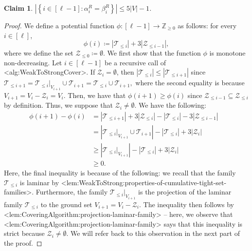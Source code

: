 \documentclass{article}
\def\Cref#1{<#1>}%
\newtheorem{claim}{Claim}[section]
\newcommand{\zeros}{\ensuremath{\mathcal{Z}}\xspace}
\newcommand{\maximalTightSetFamily}[1]{\ensuremath{\calT_{#1}}\xspace}
\newcommand{\cumulativeMaximalTightSetFamily}[1]{\ensuremath{\calT_{\leq #1}}}
\newcommand{\projCumulativeMaximalTightSetFamily}[2]{\ensuremath{\calT_{\leq #1}|_{V_{#2}}}}
\newcommand{\cumulativeZeros}[1]{\ensuremath{\calZ_{\leq #1}}\xspace}
\providecommand{\Z}{\mathbb{Z}}
\providecommand{\calT}{\mathcal{T}}
\providecommand{\calZ}{\mathcal{Z}}
\begin{document}
\begin{claim}\label{claim:WeakToStrong:hyperedge-support-size:alpha^R=weight-of-added-hyperedge}
$\left|\left\{i \in [\ell-1] : \alpha_i^R = \beta_i^R\right\}\right| \leq 5|V| - 1$.
\end{claim}
\begin{proof}
We define a potential function $\phi:[\ell - 1] \rightarrow\Z_{\geq 0}$ as follows: for every $i \in [\ell]$,
    $$\phi(i) \coloneqq  \left|\cumulativeMaximalTightSetFamily{i}\right| + 3|\cumulativeZeros{i-1}|,$$
    where we define the set $\cumulativeZeros{0} \coloneqq  \emptyset$.
We first show that the function $\phi$ is monotone non-decreasing.
Let $i \in [\ell -1]$ be a recursive call of \Cref{alg:WeakToStrongCover}. If $\zeros_i = \emptyset$, then $|\cumulativeMaximalTightSetFamily{i}| \leq |\cumulativeMaximalTightSetFamily{i+1}|$ since $\cumulativeMaximalTightSetFamily{i+1} = \cumulativeMaximalTightSetFamily{i} |_{V_{i+1}}\cup \maximalTightSetFamily{i+1} = \cumulativeMaximalTightSetFamily{i}  \cup \maximalTightSetFamily{i+1},$   where the second equality is because $V_{i+1} = V_i - \zeros_i = V_i$. Then, we have that $\phi(i+1) \geq \phi(i)$ since $\cumulativeZeros{i-1} \subseteq \cumulativeZeros{i}$ by definition. Thus, we suppose that $\zeros_i \not = \emptyset$. We have the following: 
\begin{align*}
    \phi(i+1) - \phi(i)& = |\cumulativeMaximalTightSetFamily{i+1}| + 3 |\cumulativeZeros{i}| - |\cumulativeMaximalTightSetFamily{i}| - 3|\cumulativeZeros{i-1}|&\\
    & = \left|\cumulativeMaximalTightSetFamily{i}|_{V_{i+1}}\cup \maximalTightSetFamily{i+1}  \right| - |\cumulativeMaximalTightSetFamily{i}| + 3|\zeros_{i}|&\\
    &\geq \left|\cumulativeMaximalTightSetFamily{i}|_{V_{i+1}}\right| - |\cumulativeMaximalTightSetFamily{i}| + 3|\zeros_{i}|&\\
    & \geq  0.&
\end{align*}
Here, the final inequality is because of the following: we recall that the family $\cumulativeMaximalTightSetFamily{i}$ is laminar by \Cref{lem:WeakToStrong:properties-of-cumulative-tight-set-families}. Furthermore, the family $\projCumulativeMaximalTightSetFamily{i}{i+1}$ is the projection of the laminar family $\cumulativeMaximalTightSetFamily{i}$ to the ground set $V_{i+1} = V_i - \zeros_i$. The inequality then follows by \Cref{lem:CoveringAlgorithm:projection-laminar-family}  --  here, we observe that  \Cref{lem:CoveringAlgorithm:projection-laminar-family} says that this inequality is strict because $\zeros_i \not = \emptyset$. We will refer back to this observation in the next part of the proof.


\end{proof}
\end{document}
